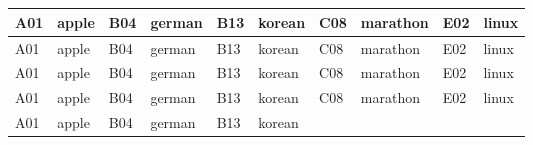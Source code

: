 \large
\begin{center}
\begin{tcolorbox}[colback=white, colframe=myBlue,title={$\vcenter{\hbox{\texttt{[image: plus.png]}}}$ \textcolor{white}{\bfseries These items are good choices.}}]
\begin{multicols}{4}
         \\
\end{multicols}
\end{tcolorbox}

~
\large
\begin{tcolorbox}[colback=white, colframe=myYellow, title={$\vcenter{\hbox{\texttt{[image: minus.png]}}}$
\textcolor{white}{\bfseries These items can be both good and bad choices at this moment, pleas hold on.}}]

\begin{tabularx}{\textwidth}{XXXXXXXXXX}
 \hline
 A01&apple&B04&german&B13&korean&C08&marathon&E02&linux\\
 \hline
 A01&apple&B04&german&B13&korean&C08&marathon&E02&linux\\
 \hline
 A01&apple&B04&german&B13&korean&C08&marathon&E02&linux\\
 \hline
 A01&apple&B04&german&B13&korean&C08&marathon&E02&linux\\
 \hline
 A01&apple&B04&german&B13&korean\\
 \hline
\end{tabularx}
\end{tcolorbox}
\end{center}

